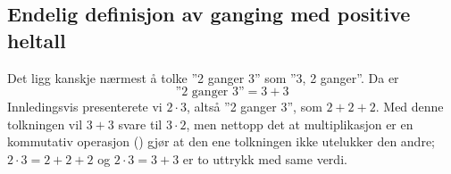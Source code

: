 \subsection*{Endelig definisjon av ganging med positive heltall}
Det ligg kanskje nærmest å tolke ''2 ganger 3'' som ''3, 2 ganger''. Da er
\[ \text{''2 ganger 3''}=3+3 \] 
Innledingsvis presenterete vi $ {2\cdot3} $, altså ''2 ganger 3'', som $ {2+2+2} $. Med denne tolkningen vil $ {3+3} $ svare til $ {3\cdot2} $, men nettopp det at multiplikasjon er en kommutativ operasjon () gjør at den ene tolkningen ikke utelukker den andre; $ {2\cdot3 =2+2+2} $ og $ {2\cdot3=3+3} $ er to uttrykk med same verdi.\regv

 \vsk \vsk




